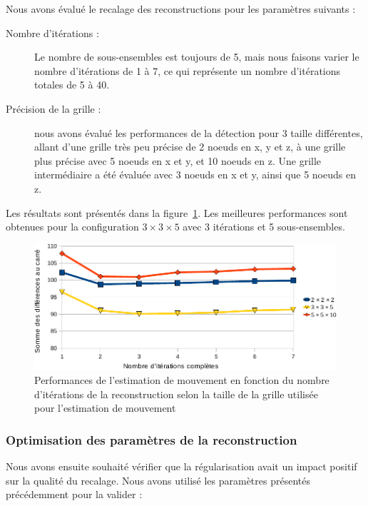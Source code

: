 Nous avons évalué le recalage des reconstructions pour les paramètres suivants :
\begin{description}
 \item[Nombre d'itérations :] Le nombre de sous-ensembles est toujours de 5, mais nous faisons varier le nombre d'itérations de 1 à 7, ce qui représente un nombre d'itérations totales de 5 à 40.
 \item[Précision de la grille :] nous avons évalué les performances de la détection pour 3 taille différentes, allant d'une grille très peu précise de 2 noeuds en x, y et z, à une grille plus précise avec 5 noeuds en x et y, et 10 noeuds en z. Une grille intermédiaire a été évaluée avec 3 noeuds en x et y, ainsi que 5 noeuds en z.
\end{description}

Les résultats sont présentés dans la figure~\ref{fig:perfsFctIterTaille}. Les meilleures performances sont obtenues pour la configuration $3 \times 3 \times 5$ avec 3 itérations et 5 sous-ensembles.

\begin{figure}
\centering
\includegraphics[width=12cm]{images/perfsRecalageFctIter-grid_crop}
\caption[Performances de l'estimation de mouvement en fonction de la taille de la grille de recherche]{Performances de l'estimation de mouvement en fonction du nombre d'itérations de la reconstruction selon la taille de la grille utilisée pour l'estimation de mouvement}
\label{fig:perfsFctIterTaille}
\end{figure}

\subsubsection{Optimisation des paramètres de la reconstruction}

Nous avons ensuite souhaité vérifier que la régularisation avait un impact positif sur la qualité du recalage. Nous avons utilisé les paramètres présentés précédemment pour la valider :

